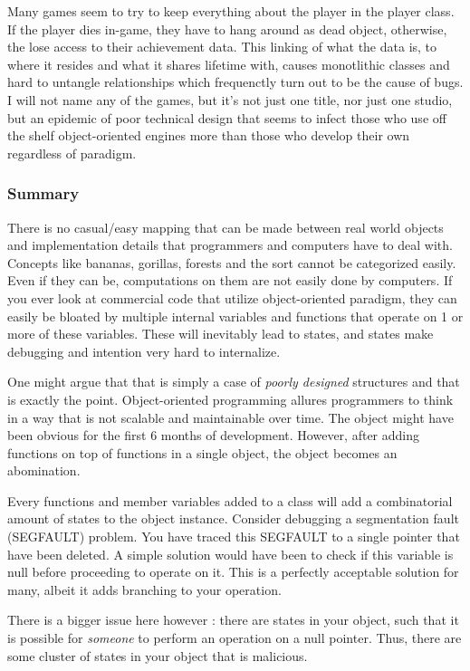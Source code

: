 \documentclass[a4paper,12pt]{book}
\begin{document}
Many games seem to try to keep everything about the player in the player class.
If the player dies in-game, they have to hang around as dead object, otherwise, the lose access to their achievement data.
This linking of what the data is, to where it resides and what it shares lifetime with, causes monotlithic classes and hard to untangle relationships which frequenctly turn out to be the cause of bugs.
I will not name any of the games, but it's not just one title, nor just one studio, but an epidemic of poor technical design that seems to infect those who use off the shelf object-oriented engines more than those who develop their own regardless of paradigm.

\subsubsection{Summary}

There is no casual/easy mapping that can be made between real world objects and implementation details that programmers and computers have to deal with.
Concepts like bananas, gorillas, forests and the sort cannot be categorized easily.
Even if they can be, computations on them are not easily done by computers.
If you ever look at commercial code that utilize object-oriented paradigm, they can easily be bloated by multiple internal variables and functions that operate on 1 or more of these variables.
These will inevitably lead to states, and states make debugging and intention very hard to internalize.

One might argue that that is simply a case of \textit{poorly designed} structures and that is exactly the point.
Object-oriented programming allures programmers to think in a way that is not scalable and maintainable over time.
The object might have been obvious for the first 6 months of development.
However, after adding functions on top of functions in a single object, the object becomes an abomination.

Every functions and member variables added to a class will add a combinatorial amount of states to the object instance.
Consider debugging a segmentation fault (SEGFAULT) problem.
You have traced this SEGFAULT to a single pointer that have been deleted.
A simple solution would have been to check if this variable is null before proceeding to operate on it.
This is a perfectly acceptable solution for many, albeit it adds branching to your operation.

There is a bigger issue here however : there are states in your object, such that it is possible for \textit{someone} to perform an operation on a null pointer.
Thus, there are some cluster of states in your object that is malicious.
\end{document}
